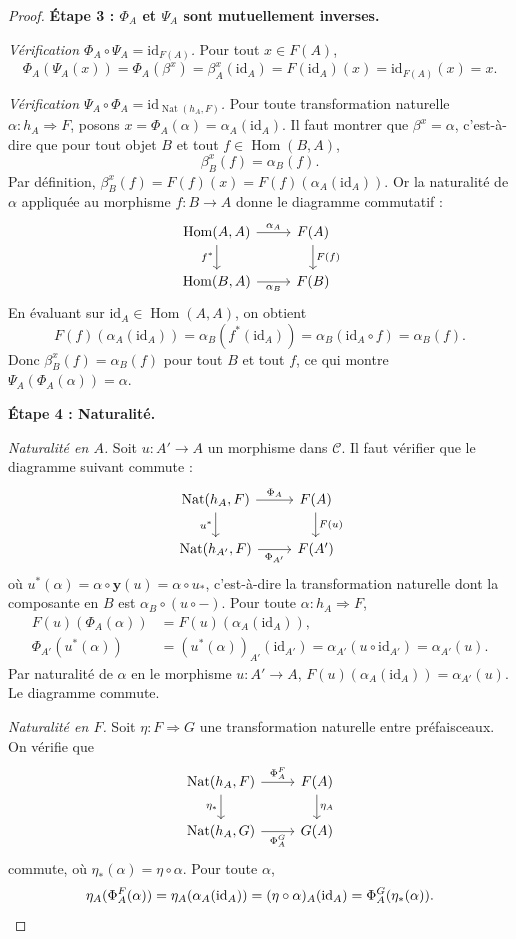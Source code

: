 \documentclass[a4paper,12pt]{book}
\DeclareMathOperator{\Hom}{Hom}
\DeclareMathOperator{\Nat}{Nat}
\newcommand{\id}{\mathrm{id}}
\begin{document}
\begin{proof}
\medskip
\textbf{Étape 3 : $\Phi_A$ et $\Psi_A$ sont mutuellement inverses.}

\emph{Vérification $\Phi_A \circ \Psi_A = \id_{F(A)}$.}
Pour tout $x \in F(A)$,
\[
    \Phi_A(\Psi_A(x))
    = \Phi_A(\beta^x)
    = \beta^x_A(\id_A)
    = F(\id_A)(x)
    = \id_{F(A)}(x)
    = x.
\]

\emph{Vérification $\Psi_A \circ \Phi_A = \id_{\Nat(h_A, F)}$.}
Pour toute transformation naturelle $\alpha \colon h_A \Rightarrow F$,
posons $x = \Phi_A(\alpha) = \alpha_A(\id_A)$.
Il faut montrer que $\beta^x = \alpha$,
c'est-à-dire que pour tout objet $B$ et tout $f \in \Hom(B, A)$,
\[
    \beta^x_B(f) = \alpha_B(f).
\]
Par définition, $\beta^x_B(f) = F(f)(x) = F(f)(\alpha_A(\id_A))$.
Or la naturalité de $\alpha$ appliquée au morphisme $f \colon B \to A$
donne le diagramme commutatif :
\[
\begin{tikzcd}
\Hom(A, A) \arrow[r, "\alpha_A"] \arrow[d, "f^*"'] &
F(A) \arrow[d, "F(f)"] \\
\Hom(B, A) \arrow[r, "\alpha_B"'] &
F(B)
\end{tikzcd}
\]
En évaluant sur $\id_A \in \Hom(A, A)$, on obtient
\[
    F(f)(\alpha_A(\id_A)) = \alpha_B(f^*(\id_A)) = \alpha_B(\id_A \circ f)
    = \alpha_B(f).
\]
Donc $\beta^x_B(f) = \alpha_B(f)$ pour tout $B$ et tout $f$,
ce qui montre $\Psi_A(\Phi_A(\alpha)) = \alpha$.

\medskip
\textbf{Étape 4 : Naturalité.}

\emph{Naturalité en $A$.}
Soit $u \colon A' \to A$ un morphisme dans $\mathcal{C}$.
Il faut vérifier que le diagramme suivant commute :
\[
\begin{tikzcd}
\Nat(h_A, F) \arrow[r, "\Phi_A"] \arrow[d, "u^*"'] &
F(A) \arrow[d, "F(u)"] \\
\Nat(h_{A'}, F) \arrow[r, "\Phi_{A'}"'] &
F(A')
\end{tikzcd}
\]
où $u^*(\alpha) = \alpha \circ \mathbf{y}(u) = \alpha \circ u_*$,
c'est-à-dire la transformation naturelle dont la composante en $B$ est
$\alpha_B \circ (u \circ -)$.
Pour toute $\alpha \colon h_A \Rightarrow F$,
\begin{align*}
    F(u)(\Phi_A(\alpha))
    &= F(u)(\alpha_A(\id_A)), \\
    \Phi_{A'}(u^*(\alpha))
    &= (u^*(\alpha))_{A'}(\id_{A'})
    = \alpha_{A'}(u \circ \id_{A'})
    = \alpha_{A'}(u).
\end{align*}
Par naturalité de $\alpha$ en le morphisme $u \colon A' \to A$,
$F(u)(\alpha_A(\id_A)) = \alpha_{A'}(u)$. Le diagramme commute.

\emph{Naturalité en $F$.}
Soit $\eta \colon F \Rightarrow G$ une transformation naturelle
entre préfaisceaux. On vérifie que
\[
\begin{tikzcd}
\Nat(h_A, F) \arrow[r, "\Phi^F_A"] \arrow[d, "\eta_*"'] &
F(A) \arrow[d, "\eta_A"] \\
\Nat(h_A, G) \arrow[r, "\Phi^G_A"'] &
G(A)
\end{tikzcd}
\]
commute, où $\eta_*(\alpha) = \eta \circ \alpha$. Pour toute $\alpha$,
\[
    \eta_A(\Phi^F_A(\alpha)) = \eta_A(\alpha_A(\id_A))
    = (\eta \circ \alpha)_A(\id_A)
    = \Phi^G_A(\eta_*(\alpha)). \qedhere
\]
\end{proof}
\end{document}
